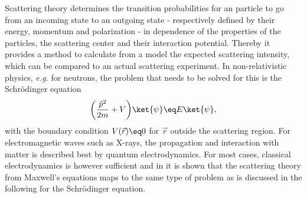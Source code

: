 \documentclass[\main/dresen_thesis.tex]{subfiles}
\begin{document}
    Scattering theory determines the transition probabilities for an particle to go from an incoming state to an outgoing state - respectively defined by their energy, momentum and polarization - in dependence of the properties of the particles, the scattering center and their interaction potential.
    Thereby it provides a method to calculate from a model the expected scattering intensity, which can be compared to an actual scattering experiment.
    In non-relativistic physics, \textit{e.g.} for neutrons, the problem that needs to be solved for this is the Schr\"odinger equation
    \begin{align}
      \label{eq:theoreticalBackground:scattering:scatteringTheory:schrodingerEquation}
      \bigg(\frac{\hat{p}^2}{2m} + V \bigg) \ket{\psi} \eq E \ket{\psi},
    \end{align}
    with the boundary condition $V(\vec{r}) \eq 0$ for $\vec{r}$ outside the scattering region.
    For electromagnetic waves such as X-rays, the propagation and interaction with matter is described best by quantum electrodynamics.
    For most cases, classical electrodynamics is however sufficient and in  it is shown that the scattering theory from Maxwell's equations maps to the same type of problem as is discussed in the following for the Schr\"odinger equation.
\end{document}
